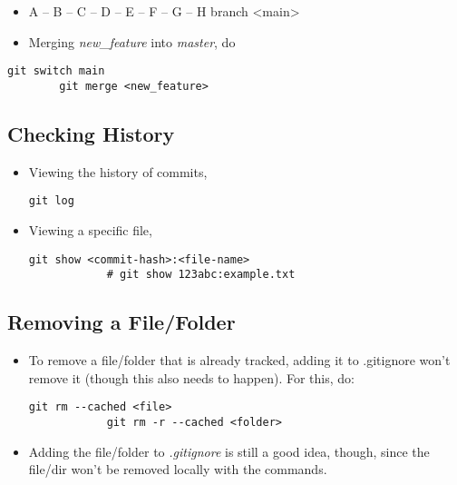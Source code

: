 \documentclass[12pt, a4paper]{article}
\numberwithin{equation}{section}
\theoremstyle{definition}
\theoremstyle{definition}
\begin{document}
	\begin{itemize} 
		\item A -- B -- C -- D -- E -- F -- G -- H branch <main>
		\item Merging \textit{new_feature} into \textit{master}, do 
	\end{itemize}

	\begin{lstlisting}[style=mystylebash, label=alg:merging1, xleftmargin=\parindent]
		git switch main
		git merge <new_feature>
	\end{lstlisting}
	
	\subsection{Checking History}
	\begin{itemize}
		\item Viewing the history of commits,
		
		\begin{lstlisting}[style=mystylebash, label=alg:history1, xleftmargin=\parindent]
			git log
		\end{lstlisting}
	
		\item Viewing a specific file,
		\begin{lstlisting}[style=mystylebash, label=alg:history1, xleftmargin=\parindent]
			git show <commit-hash>:<file-name>
			# git show 123abc:example.txt
		\end{lstlisting}
	\end{itemize}
	
	\subsection{Removing a File/Folder}
	
	\begin{itemize}
		\item To remove a file/folder that is already tracked, adding it to .gitignore won’t remove it (though this also needs to happen). For this, do:
		
		\begin{lstlisting}[style=mystylebash, label=alg:git_remove, xleftmargin=\parindent]
			git rm --cached <file>
			git rm -r --cached <folder>
		\end{lstlisting}

		\item Adding the file/folder to \textit{.gitignore} is still a good idea, though, since the file/dir won’t be removed locally with the commands.
	\end{itemize}
	
\end{document}
